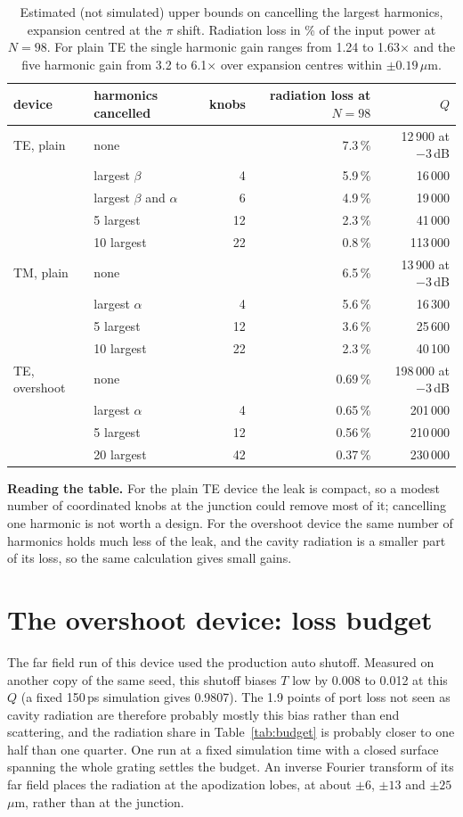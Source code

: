 \documentclass[11pt]{article}
\begin{document}
\begin{table}[H]
\centering\small
\begin{tabular}{llrrr}
\toprule
device & harmonics cancelled & knobs & radiation loss at $N=98$ & $Q$ \\
\midrule
TE, plain & none & & 7.3\,\% & 12\,900 at $-3$\,dB \\
 & largest $\beta$ & 4 & 5.9\,\% & 16\,000 \\
 & largest $\beta$ and $\alpha$ & 6 & 4.9\,\% & 19\,000 \\
 & 5 largest & 12 & 2.3\,\% & 41\,000 \\
 & 10 largest & 22 & 0.8\,\% & 113\,000 \\
\midrule
TM, plain & none & & 6.5\,\% & 13\,900 at $-3$\,dB \\
 & largest $\alpha$ & 4 & 5.6\,\% & 16\,300 \\
 & 5 largest & 12 & 3.6\,\% & 25\,600 \\
 & 10 largest & 22 & 2.3\,\% & 40\,100 \\
\midrule
TE, overshoot & none & & 0.69\,\% & 198\,000 at $-3$\,dB \\
 & largest $\alpha$ & 4 & 0.65\,\% & 201\,000 \\
 & 5 largest & 12 & 0.56\,\% & 210\,000 \\
 & 20 largest & 42 & 0.37\,\% & 230\,000 \\
\bottomrule
\end{tabular}
\caption{Estimated (not simulated) upper bounds on cancelling the largest harmonics, expansion centred at the $\pi$ shift. Radiation loss in \% of the input power at $N=98$. For plain TE the single harmonic gain ranges from 1.24 to 1.63$\times$ and the five harmonic gain from 3.2 to 6.1$\times$ over expansion centres within $\pm0.19$\,$\mu$m.}
\label{tab:gain}
\end{table}

\textbf{Reading the table.} For the plain TE device the leak is compact, so a modest number of coordinated knobs at the junction could remove most of it; cancelling one harmonic is not worth a design. For the overshoot device the same number of harmonics holds much less of the leak, and the cavity radiation is a smaller part of its loss, so the same calculation gives small gains.

\section{The overshoot device: loss budget}
The far field run of this device used the production auto shutoff. Measured on another copy of the same seed, this shutoff biases $T$ low by 0.008 to 0.012 at this $Q$ (a fixed 150\,ps simulation gives 0.9807). The 1.9 points of port loss not seen as cavity radiation are therefore probably mostly this bias rather than end scattering, and the radiation share in Table~\ref{tab:budget} is probably closer to one half than one quarter. One run at a fixed simulation time with a closed surface spanning the whole grating settles the budget. An inverse Fourier transform of its far field places the radiation at the apodization lobes, at about $\pm6$, $\pm13$ and $\pm25$\,$\mu$m, rather than at the junction.
\end{document}
